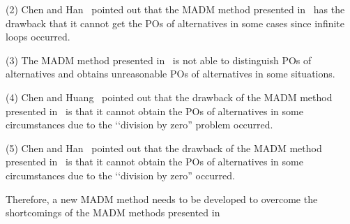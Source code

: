 \documentclass[twocolumn]{IEEEtran}
\begin{document}
    (2) Chen and Han~\cite{chen2018} pointed out that the MADM method presented in~\cite{chen2017} has the drawback that it cannot get the POs of alternatives in some cases since infinite loops occurred.
    
    (3) The MADM method presented in~\cite{chen2021} is not able to distinguish POs of alternatives and obtains unreasonable POs of alternatives in some situations.
    
    (4) Chen and Huang~\cite{chen2017_2} pointed out that the drawback of the MADM method presented in~\cite{chen2010} is that it cannot obtain the POs of alternatives in some circumstances due to the ‘‘division by zero” problem occurred.
    
    (5) Chen and Han~\cite{chen2018} pointed out that the drawback of the MADM method presented in~\cite{Zhao2011} is that it cannot obtain the POs of alternatives in some circumstances due to the ‘‘division by zero” occurred.

Therefore, a new MADM method needs to be developed to overcome the shortcomings of the MADM methods presented in~\cite{chen2015}~\cite{chen2017}~\cite{chen2021}~\cite{chen2010}~\cite{Zhao2011}



\end{document}

